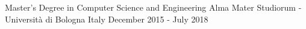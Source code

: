 

\begin{cventries}

  \cventry
    {Master's Degree in Computer Science and Engineering} %
    {Alma Mater Studiorum - Università di Bologna} %
    {Italy} %
    {December 2015 - July 2018} %
    {}




\end{cventries}
